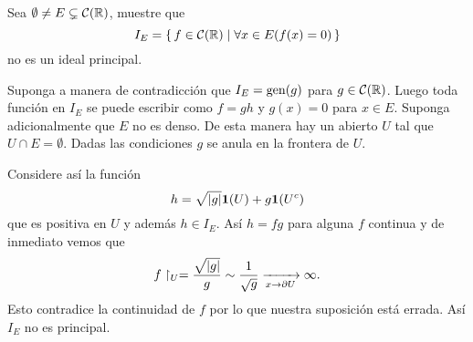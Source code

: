 \documentclass[12pt]{memoir}
\begin{document}
\begin{multicols}{2}

\begin{Ej}
  Sea $\emptyset\neq E\subsetneq\mathcal{C}(\mathbb{R})$, muestre que
  $$I_E=\set{f\in\cC(\bR)\mid\forall x\in E(f(x)=0)}$$
  no es un ideal principal.
\end{Ej}

\begin{ptcbp}
Suponga a manera de contradicción que $I_E=\operatorname{gen}(g)$ para $g\in\mathcal{C}(\mathbb{R})$. Luego toda función en $I_E$ se puede escribir como $f=gh$ y $g(x)=0$ para $x\in E$. Suponga adicionalmente que $E$ no es denso. De esta manera hay un abierto $U$ tal que $U\cap E =\emptyset$. Dadas las condiciones $g$ se anula en la frontera de $U$.\par
Considere así la función
$$h=\sqrt{|g|}\mathbf{1}(U)+g\mathbf{1}(U^c)$$
que es positiva en $U$ y además $h\in I_E$. Así $h=fg$ para alguna $f$ continua y de inmediato vemos que
$$f\upharpoonright_{U}=\frac{\sqrt{|g|}}{g}\sim\frac{1}{\sqrt{g}}\xrightarrow[x\to\partial U]{}\infty.$$
Esto contradice la continuidad de $f$ por lo que nuestra suposición está errada. Así $I_E$ no es principal.
\end{ptcbp}

\end{multicols}
\end{document}
